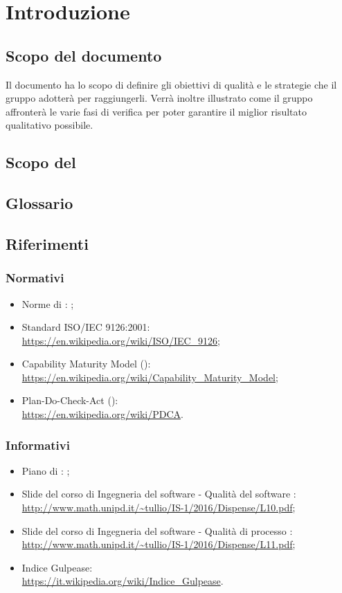 \documentclass[PianoDiQualifica.tex]{subfiles}
\begin{document}
\section{Introduzione}
	\subsection{Scopo del documento}
		Il documento ha lo scopo di definire gli obiettivi di qualità e le strategie che il gruppo \GRUPPO{}
		adotterà per raggiungerli. Verrà inoltre illustrato come il gruppo affronterà le varie fasi di verifica
		per poter garantire il miglior risultato qualitativo possibile.
	\subsection{Scopo del }
		\SCOPO
	\subsection{Glossario}
		\GLOSSARIO
	\subsection{Riferimenti}
		\subsubsection{Normativi}
			\begin{itemize}
				\item Norme di : \NPdocRR{};
				\item Standard ISO/IEC 9126:2001: \\
				\url{https://en.wikipedia.org/wiki/ISO/IEC_9126};
				\item Capability Maturity Model (): \\
				\url{https://en.wikipedia.org/wiki/Capability_Maturity_Model};
				\item Plan-Do-Check-Act (): \\
				\url{https://en.wikipedia.org/wiki/PDCA}.
			\end{itemize}
		\subsubsection{Informativi}
			\begin{itemize}
				\item Piano di : \PPdocRR{};
				\item Slide del corso di Ingegneria del software - Qualità del software : \\
				\url{http://www.math.unipd.it/~tullio/IS-1/2016/Dispense/L10.pdf};
				\item Slide del corso di Ingegneria del software - Qualità di processo : \\
				\url{http://www.math.unipd.it/~tullio/IS-1/2016/Dispense/L11.pdf};
				\item Indice Gulpease: \\
				\url{https://it.wikipedia.org/wiki/Indice_Gulpease}.
			\end{itemize}
			
\end{document}
